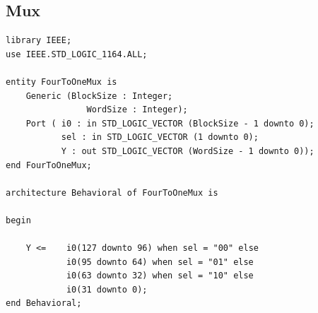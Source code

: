 \documentclass{article}
\begin{document}
\subsection{Mux}
\begin{lstlisting}
library IEEE;
use IEEE.STD_LOGIC_1164.ALL;

entity FourToOneMux is
    Generic (BlockSize : Integer;
                WordSize : Integer);
    Port ( i0 : in STD_LOGIC_VECTOR (BlockSize - 1 downto 0);
           sel : in STD_LOGIC_VECTOR (1 downto 0);
           Y : out STD_LOGIC_VECTOR (WordSize - 1 downto 0));
end FourToOneMux;

architecture Behavioral of FourToOneMux is

begin
    
    Y <=    i0(127 downto 96) when sel = "00" else
            i0(95 downto 64) when sel = "01" else
            i0(63 downto 32) when sel = "10" else
            i0(31 downto 0);
end Behavioral;
\end{lstlisting}
\newpage

\nocite{*}



\end{document}
